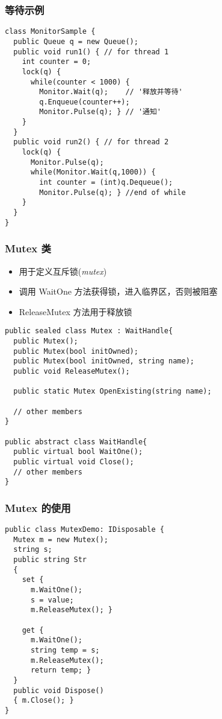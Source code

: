 \begin{frame}
\frametitle{等待示例}
\begin{lstlisting}[escapeinside='']
class MonitorSample {
  public Queue q = new Queue(); 
  public void run1() { // for thread 1
    int counter = 0;
    lock(q) {
      while(counter < 1000) {
        Monitor.Wait(q);    // '释放并等待'
        q.Enqueue(counter++);
        Monitor.Pulse(q); } // '通知'
    }
  }
  public void run2() { // for thread 2
    lock(q) {
      Monitor.Pulse(q);
      while(Monitor.Wait(q,1000)) {
        int counter = (int)q.Dequeue();
        Monitor.Pulse(q); } //end of while
    }
  }
}
\end{lstlisting}
\end{frame}

\begin{frame}
\frametitle{Mutex 类}
\begin{itemize}
\item 用于定义互斥锁(\textit{mutex})
\item 调用 WaitOne 方法获得锁，进入临界区，否则被阻塞
\item ReleaseMutex 方法用于释放锁
\end{itemize}

\begin{lstlisting}
public sealed class Mutex : WaitHandle{
  public Mutex();
  public Mutex(bool initOwned);
  public Mutex(bool initOwned, string name);
  public void ReleaseMutex();

  public static Mutex OpenExisting(string name);
  
  // other members
}

public abstract class WaitHandle{
  public virtual bool WaitOne();
  public virtual void Close();
  // other members  
}
\end{lstlisting}
\end{frame}

\begin{frame}[fragile]
\frametitle{Mutex 的使用}
\begin{lstlisting}
public class MutexDemo: IDisposable {
  Mutex m = new Mutex();
  string s;
  public string Str
  { 
    set { 
      m.WaitOne();
      s = value;
      m.ReleaseMutex(); }

    get { 
      m.WaitOne();
      string temp = s;
      m.ReleaseMutex();
      return temp; } 
  }
  public void Dispose()
  { m.Close(); }
}
\end{lstlisting}
\end{frame}



